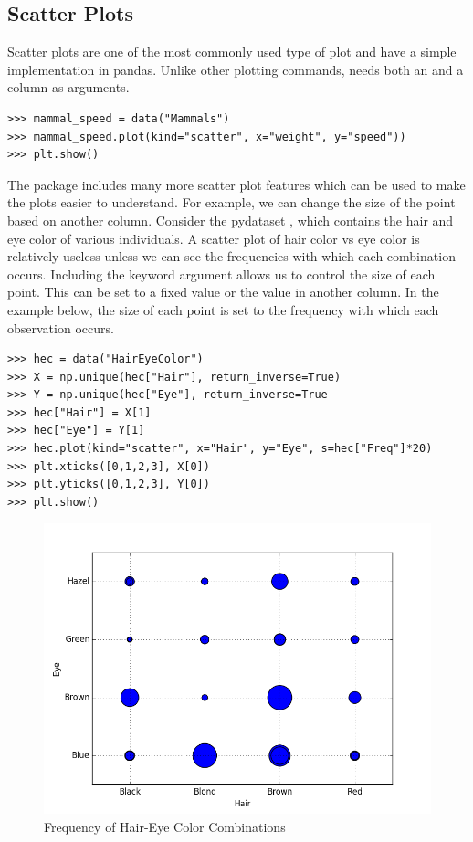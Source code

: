 \subsection*{Scatter Plots}

Scatter plots are one of the most commonly used type of plot and have a simple implementation in pandas. Unlike other plotting commands,  needs both an  and a  column as arguments.


\begin{lstlisting}
>>> mammal_speed = data("Mammals")
>>> mammal_speed.plot(kind="scatter", x="weight", y="speed"))
>>> plt.show()
\end{lstlisting}


The package includes many more scatter plot features which can be used to make the plots easier to understand.  For example, we can change the size of the point based on another column.  Consider the pydataset , which contains the hair and eye color of various individuals. A scatter plot of hair color vs eye color is relatively useless unless we can see the frequencies with which each combination occurs.  Including the keyword argument  allows us to control the size of each point.  This can be set to a fixed value or the value in another column.  In the example below, the size of each point is set to the frequency with which each observation occurs.  

\begin{lstlisting}
>>> hec = data("HairEyeColor")
>>> X = np.unique(hec["Hair"], return_inverse=True)
>>> Y = np.unique(hec["Eye"], return_inverse=True
>>> hec["Hair"] = X[1]
>>> hec["Eye"] = Y[1]
>>> hec.plot(kind="scatter", x="Hair", y="Eye", s=hec["Freq"]*20)
>>> plt.xticks([0,1,2,3], X[0])
>>> plt.yticks([0,1,2,3], Y[0])
>>> plt.show()
\end{lstlisting}

\begin{figure}[H] 
    \centering
    \includegraphics[width=.75\textwidth]{HairEyeColorscatter.png}
    \caption{Frequency of Hair-Eye Color Combinations}
\end{figure}


